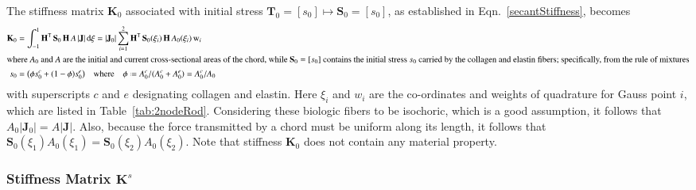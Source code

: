 The stiffness matrix $\mathbf{K}_0$ associated with initial stress $\mathbf{T}_0 = [s_0] \mapsto \mathbf{S}_0 = [s_0]$, as established in Eqn.~\eqref{secantStiffness}, becomes 
\begin{subequations}
    \begin{align}
    \mathbf{K}_0 & = \int_{-1}^{1} \mathbf{H}^{\mathsf{T}} \,  \mathbf{S}_0 \, \mathbf{H} \, A \, |\mathbf{J}| \, \mathrm{d} \xi
    = | \mathbf{J}_0 | \sum_{i=1}^{2}  \mathbf{H}^{\mathsf{T}} \, \mathbf{S}_0 (\xi_i) \, \mathbf{H} \, A_0 (\xi_i) \, \mathrm{w}_i \\
    \intertext{where $A_0$ and $A$ are the initial and current cross-sectional areas of the chord, while $\mathbf{S}_0 = [s_0]$ contains the initial stress $s_0$ carried by the collagen and elastin fibers; specifically, from the rule of mixtures}
    s_0 & = \bigl( \phi s_0^c + (1-\phi) s_0^e \bigr) 
    \quad \text{where} \quad
    \phi \defeq A^c_0 / ( A^c_0 + A^e_0 ) = A^c_0 / A_0
    \end{align}
\end{subequations}
with superscripts $c$ and $e$ designating collagen and elastin.  Here $\xi_i$ and $w_i$ are the co-ordinates and weights of quadrature for Gauss point $i$, which are listed in Table~\ref{tab:2nodeRod}.  Considering these biologic fibers to be isochoric, which is a good assumption, it follows that $A_0 | \mathbf{J}_0 | = A | \mathbf{J} |$.  Also, because the force transmitted by a chord must be uniform along its length, it follows that $\mathbf{S}_0 (\xi_1) A_0(\xi_1) = \mathbf{S}_0 (\xi_2) A_0(\xi_2)$.  Note that stiffness $\mathbf{K}_0$ does not contain any material property.

\subsubsection{Stiffness Matrix $\mathbf{K}^s$}

